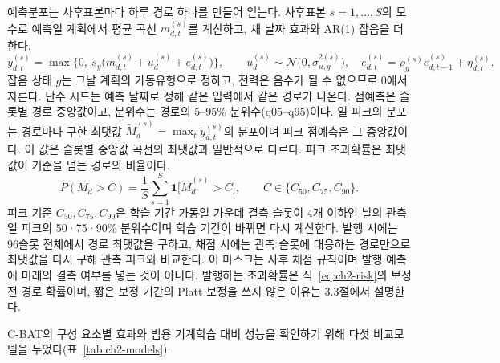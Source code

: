 예측분포는 사후표본마다 하루 경로 하나를 만들어 얻는다. 사후표본 $s=1,\dots,S$의 모수로 예측일 계획에서 평균 곡선 $m^{(s)}_{d,t}$를 계산하고, 새 날짜 효과와 AR(1) 잡음을 더한다.
\begin{equation}
\tilde y^{(s)}_{d,t} = \max\!\Big\{0,\ s_y\big(m^{(s)}_{d,t} + u^{(s)}_d + e^{(s)}_{d,t}\big)\Big\},
\qquad u^{(s)}_d\sim\mathcal N\big(0,\sigma^{2(s)}_{u,g}\big),\quad
e^{(s)}_{d,t}=\rho^{(s)}_g e^{(s)}_{d,t-1}+\eta^{(s)}_{d,t}.
\label{eq:ch2-path}
\end{equation}
잡음 상태 $g$는 그날 계획의 가동유형으로 정하고, 전력은 음수가 될 수 없으므로 0에서 자른다. 난수 시드는 예측 날짜로 정해 같은 입력에서 같은 경로가 나온다. 점예측은 슬롯별 경로 중앙값이고, 분위수는 경로의 5--95\% 분위수(q05--q95)이다. 일 피크의 분포는 경로마다 구한 최댓값 $\tilde M^{(s)}_d=\max_t \tilde y^{(s)}_{d,t}$의 분포이며 피크 점예측은 그 중앙값이다. 이 값은 슬롯별 중앙값 곡선의 최댓값과 일반적으로 다르다. 피크 초과확률은 최댓값이 기준을 넘는 경로의 비율이다.
\begin{equation}
\hat P(M_d > C) = \frac1S\sum_{s=1}^{S}\mathbf 1\big[\tilde M^{(s)}_d > C\big],
\qquad C\in\{C_{50},C_{75},C_{90}\}.
\label{eq:ch2-risk}
\end{equation}
피크 기준 $C_{50},C_{75},C_{90}$은 학습 기간 가동일 가운데 결측 슬롯이 4개 이하인 날의 관측 일 피크의 50·75·90\% 분위수이며 학습 기간이 바뀌면 다시 계산한다. 발행 시에는 96슬롯 전체에서 경로 최댓값을 구하고, 채점 시에는 관측 슬롯에 대응하는 경로만으로 최댓값을 다시 구해 관측 피크와 비교한다. 이 마스크는 사후 채점 규칙이며 발행 예측에 미래의 결측 여부를 넣는 것이 아니다. 발행하는 초과확률은 식~\eqref{eq:ch2-risk}의 보정 전 경로 확률이며, 짧은 보정 기간의 Platt 보정을 쓰지 않은 이유는 3.3절에서 설명한다.


C-BAT의 구성 요소별 효과와 범용 기계학습 대비 성능을 확인하기 위해 다섯 비교모델을 두었다(표~\ref{tab:ch2-models}).

